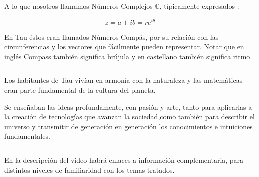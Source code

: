 \documentclass[preview]{standalone}
\begin{document}
\begin{center}
A lo que nosotros llamamos Números Complejos $\mathbb{C}$, típicamente expresados :

$$z=a+ib=re^{i\theta}$$ 

En Tau éstos eran llamados Números Compás, por su relación con las  circunferencias y los vectores que fácilmente pueden representar.
Notar que en inglés Compass también significa brújula y en castellano también significa ritmo 

$$ $$


Los habitantes de Tau vivían en armonía con la naturaleza y las matemáticas eran parte fundamental de la cultura del planeta. 

Se enseñaban las ideas profundamente, con pasión y arte, tanto para aplicarlas a la creación de tecnologías que avanzan la sociedad,como también para describir el universo  y transmitir de generación en generación los conocimientos e intuiciones fundamentales. 

$$ $$ 

En la descripción del video habrá enlaces a información complementaria, para distintos niveles de familiaridad con los temas tratados.
\end{center}
\end{document}
